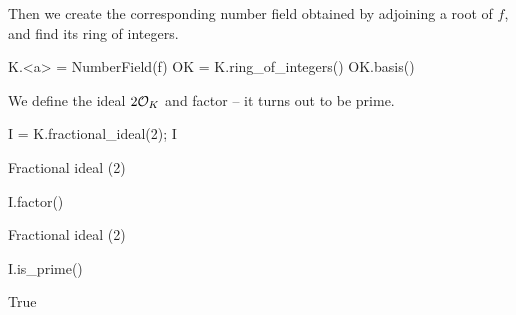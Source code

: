 \par\noindent{}Then we create the corresponding number field obtained
by adjoining a root of $f$, and find its ring of integers.
\begin{sagecode}
\begin{sagecell}
K.<a> = NumberField(f)
OK = K.ring_of_integers()
OK.basis()
\end{sagecell}
\begin{sageout}
[1, a, a^2, a^3, a^4]
\end{sageout}
\end{sagecode} %

\par\noindent{}We define the ideal $2\mathcal{O}_K$ and factor -- it turns
out to be prime.
\begin{sagecode}
\begin{sagecell}
I = K.fractional_ideal(2); I
\end{sagecell}
\begin{sageout}
Fractional ideal (2)
\end{sageout}
\begin{sagecell}
I.factor()
\end{sagecell}
\begin{sageout}
Fractional ideal (2)
\end{sageout}
\begin{sagecell}
I.is_prime()
\end{sagecell}
\begin{sageout}
True
\end{sageout}
\end{sagecode} %

